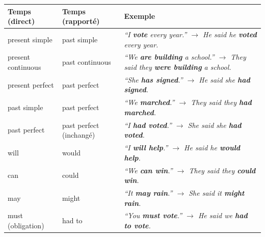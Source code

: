 \documentclass[11pt]{article}
\newcommand{\eng}[1]{\ifmmode\text{\textit{#1}}\else\begingroup\selectlanguage{english}\itshape #1\endgroup\fi}
\begin{document}
\begin{center}
\begin{tabularx}{\linewidth}{|l|X|X|}
\hline
\rowcolor{popblueL} \textbf{Temps (direct)} & \textbf{Temps (rapport\'e)} & \textbf{Exemple} \\
\hline
present simple & past simple & \eng{``I \textbf{vote} every year.''} $\rightarrow$ \eng{He said he \textbf{voted} every year.} \\
\hline
present continuous & past continuous & \eng{``We \textbf{are building} a school.''} $\rightarrow$ \eng{They said they \textbf{were building} a school.} \\
\hline
present perfect & past perfect & \eng{``She \textbf{has signed}.''} $\rightarrow$ \eng{He said she \textbf{had signed}.} \\
\hline
past simple & past perfect & \eng{``We \textbf{marched}.''} $\rightarrow$ \eng{They said they \textbf{had marched}.} \\
\hline
past perfect & past perfect (inchang\'e) & \eng{``I \textbf{had voted}.''} $\rightarrow$ \eng{She said she \textbf{had voted}.} \\
\hline
will & would & \eng{``I \textbf{will help}.''} $\rightarrow$ \eng{He said he \textbf{would help}.} \\
\hline
can & could & \eng{``We \textbf{can win}.''} $\rightarrow$ \eng{They said they \textbf{could win}.} \\
\hline
may & might & \eng{``It \textbf{may rain}.''} $\rightarrow$ \eng{She said it \textbf{might rain}.} \\
\hline
must (obligation) & had to & \eng{``You \textbf{must vote}.''} $\rightarrow$ \eng{He said we \textbf{had to vote}.} \\
\hline
\end{tabularx}
\end{center}
\end{document}

